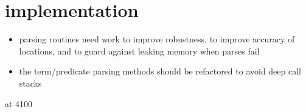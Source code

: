 \section{\acslpp implementation}

\begin{itemize}
\item parsing routines need work to improve robustness, to improve accuracy of locations, and to guard against leaking memory when parses fail
\item the term/predicate parsing methods should be refactored to avoid deep call stacks

\end{itemize}



at 4100